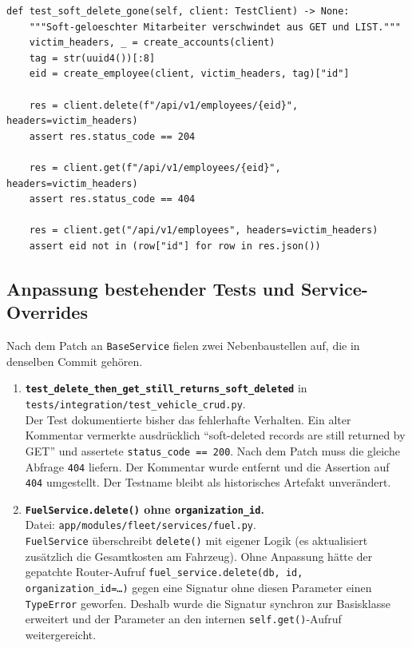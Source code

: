 \begin{lstlisting}[style=custompython, caption={\texttt{TestIDOREmployee.test\_soft\_delete\_gone} \textendash{} Soft-Delete auf Mitarbeitende statt Fahrzeugen.}]
def test_soft_delete_gone(self, client: TestClient) -> None:
    """Soft-geloeschter Mitarbeiter verschwindet aus GET und LIST."""
    victim_headers, _ = create_accounts(client)
    tag = str(uuid4())[:8]
    eid = create_employee(client, victim_headers, tag)["id"]

    res = client.delete(f"/api/v1/employees/{eid}", headers=victim_headers)
    assert res.status_code == 204

    res = client.get(f"/api/v1/employees/{eid}", headers=victim_headers)
    assert res.status_code == 404

    res = client.get("/api/v1/employees", headers=victim_headers)
    assert eid not in (row["id"] for row in res.json())
\end{lstlisting}

\subsection{Anpassung bestehender Tests und Service-Overrides}
\label{sec:anpassung-tests}

Nach dem Patch an \texttt{BaseService} fielen zwei Nebenbaustellen auf,
die in denselben Commit gehören.

\begin{enumerate}
      \item \textbf{\texttt{test\_delete\_then\_get\_\allowbreak still\_returns\_\allowbreak soft\_deleted}}
            in \texttt{tests/integration/\allowbreak test\_vehicle\_crud.py}.\\
            Der Test dokumentierte bisher das fehlerhafte Verhalten. Ein
            alter Kommentar vermerkte ausdrücklich ``soft-deleted records
            are still returned by GET'' und assertete
            \texttt{status\_code == 200}. Nach dem Patch muss die gleiche
            Abfrage \texttt{404} liefern. Der Kommentar wurde entfernt
            und die Assertion auf \texttt{404} umgestellt. Der Testname
            bleibt als historisches Artefakt unverändert.

      \item \textbf{\texttt{FuelService.delete()} ohne \texttt{organization\_id}.}\\
            Datei: \texttt{app/modules/fleet/\allowbreak services/fuel.py}.\\
            \texttt{FuelService} überschreibt \texttt{delete()} mit eigener
            Logik (es aktualisiert zusätzlich die Gesamtkosten am Fahrzeug).
            Ohne Anpassung hätte der gepatchte Router-Aufruf
            \texttt{fuel\_service.delete(db, id, organization\_id=\ldots)}
            gegen eine Signatur ohne diesen Parameter einen
            \texttt{TypeError} geworfen. Deshalb wurde die Signatur synchron
            zur Basisklasse erweitert und der Parameter an den internen
            \texttt{self.get()}-Aufruf weitergereicht.
\end{enumerate}

